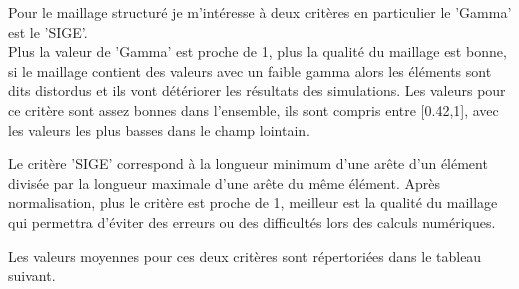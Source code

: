 Pour le maillage structuré je m'intéresse à deux critères en particulier le 'Gamma' est le 'SIGE'.\\
Plus la valeur de 'Gamma' est proche de 1, plus la qualité du maillage est bonne, si le maillage contient des valeurs avec un faible gamma alors les éléments sont dits distordus et ils vont détériorer les résultats des simulations. Les valeurs pour ce critère sont assez bonnes dans l'ensemble, ils sont compris entre [0.42,1], avec les valeurs les plus basses dans le champ lointain.

Le critère 'SIGE' correspond à la longueur minimum d'une arête d'un élément divisée par la longueur maximale d'une arête du même élément. Après normalisation, plus le critère est proche de 1, meilleur est la qualité du maillage qui permettra d'éviter des erreurs ou des difficultés lors des calculs numériques.

Les valeurs moyennes pour ces deux critères sont répertoriées dans le tableau suivant.

